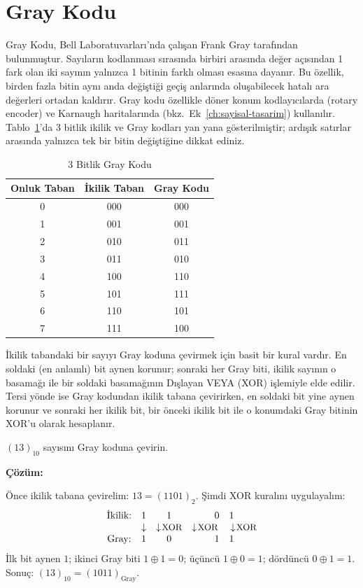\section{Gray Kodu}
\label{sec:gray-kodu}

Gray Kodu, Bell Laboratuvarları'nda çalışan Frank Gray tarafından bulunmuştur. Sayıların kodlanması sırasında birbiri arasında değer açısından 1 fark olan iki sayının yalnızca 1 bitinin farklı olması esasına dayanır. Bu özellik, birden fazla bitin aynı anda değiştiği geçiş anlarında oluşabilecek hatalı ara değerleri ortadan kaldırır. Gray kodu özellikle döner konum kodlayıcılarda (rotary encoder) ve Karnaugh haritalarında (bkz.\ Ek~\ref{ch:sayisal-tasarim}) kullanılır. Tablo~\ref{tab:gray-kodu}'da 3 bitlik ikilik ve Gray kodları yan yana gösterilmiştir; ardışık satırlar arasında yalnızca tek bir bitin değiştiğine dikkat ediniz.

\begin{table}[H]
\centering
\caption{3 Bitlik Gray Kodu}
\label{tab:gray-kodu}
\begin{tabular}{ccc}
\toprule
\textbf{Onluk Taban} & \textbf{İkilik Taban} & \textbf{Gray Kodu} \\
\midrule
0 & 000 & 000 \\
1 & 001 & 001 \\
2 & 010 & 011 \\
3 & 011 & 010 \\
4 & 100 & 110 \\
5 & 101 & 111 \\
6 & 110 & 101 \\
7 & 111 & 100 \\
\bottomrule
\end{tabular}
\end{table}

İkilik tabandaki bir sayıyı Gray koduna çevirmek için basit bir kural vardır. En soldaki (en anlamlı) bit aynen korunur; sonraki her Gray biti, ikilik sayının o basamağı ile bir soldaki basamağının Dışlayan VEYA (XOR) işlemiyle elde edilir. Tersi yönde ise Gray kodundan ikilik tabana çevirirken, en soldaki bit yine aynen korunur ve sonraki her ikilik bit, bir önceki ikilik bit ile o konumdaki Gray bitinin XOR'u olarak hesaplanır.

\begin{ornek}[A.21]
$(13)_{10}$ sayısını Gray koduna çevirin.

\textbf{Çözüm:}

Önce ikilik tabana çevirelim: $13 = (1101)_2$. Şimdi XOR kuralını uygulayalım:
\[
\begin{array}{cccc}
\text{İkilik:} & 1 & 1 & 0 \quad 1 \\
& \downarrow & \downarrow\!\!\text{\small\,XOR} & \downarrow\!\!\text{\small\,XOR} \quad \downarrow\!\!\text{\small\,XOR} \\
\text{Gray:} & 1 & 0 & 1 \quad 1
\end{array}
\]
İlk bit aynen $1$; ikinci Gray biti $1 \oplus 1 = 0$; üçüncü $1 \oplus 0 = 1$; dördüncü $0 \oplus 1 = 1$. Sonuç: $(13)_{10} = (1011)_{\text{Gray}}$.
\end{ornek}


